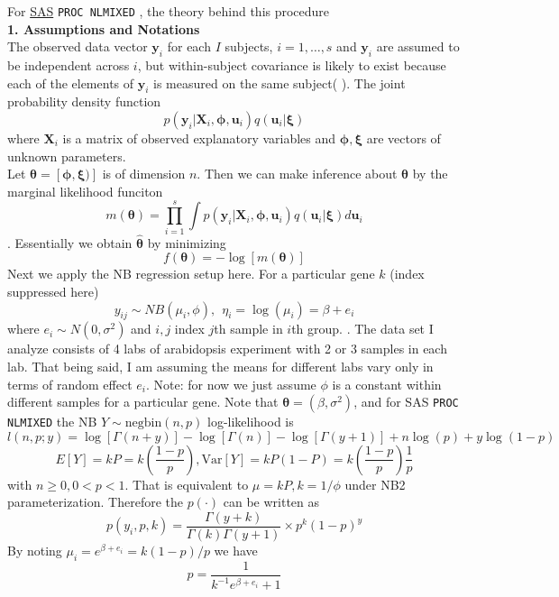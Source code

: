 \documentclass[paper=a4, fontsize=12.5pt]{scrartcl} %
\numberwithin{equation}{section} %
\numberwithin{figure}{section} %
\numberwithin{table}{section} %
\begin{document}
For  \href{http://support.sas.com/documentation/cdl/en/statug/63033/HTML/default
/viewer.htm#statug_nlmixed_sect022.htm}{SAS} \verb"PROC NLMIXED" , the theory behind this procedure \\
\textbf{1. Assumptions and Notations}\\
  The observed data vector $\bm y_i$ for each $I$ subjects, $i=1, \ldots, s$ and $\bm y_i$ are assumed to be independent across $i$, but within-subject covariance is likely to exist because each of the elements of $\bm y_i$ is measured on the same subject( {\color{blue}{that implies it can deal with repeated measurement}}). The joint probability density function 
  \[p(\bm y_i|\bm X_i, \bm \phi, \bm u_i)q(\bm u_i|\bm \xi)\]
  where $\bm X_i$ is a matrix of observed explanatory variables and $\bm \phi, \bm \xi$ are vectors of unknown parameters.\\
  Let $\bm \theta =[\bm \phi, \bm \xi)]$ is of dimension $n$. Then we can make inference about $\bm\theta$ by the marginal likelihood funciton
  \[m(\bm \theta)= \prod_{i=1}^s\int p(\bm y_i|\bm X_i, \bm \phi, \bm u_i)q(\bm u_i|\bm \xi)d\bm u_i\]. Essentially we obtain $\hat{\bm \theta}$ by minimizing 
  $$f(\bm \theta)= -\log [m(\bm \theta)]$$
 Next we apply the NB regression setup here. For a particular gene $k$ (index suppressed here)
  \[y_{ij} \sim NB(\mu_i, \phi), ~~ \eta_i = \log(\mu_i)= \beta + e_i\]
  where $e_i\sim N(0, \sigma^2)$ and $i, j$ index $j$th sample in $i$th group. {\color{blue}{not sure if normalization is needed yet, in which case we might begin with $\log(\mu_i)= \beta + \log (N_i R_i) + e_i$}}. The data set I analyze consists of 4 labs of arabidopsis experiment with 2 or 3 samples in each lab. That being said, I am assuming the means for different labs vary only in terms of random effect $e_i$.  {\color{blue} Note: for now we just assume $\phi$ is a constant within different samples for a particular gene.}
  Note that $\bm \theta= (\beta, \sigma^2)$, and for SAS \verb"PROC NLMIXED" the NB $Y\sim \text{negbin}(n, p)$ log-likelihood is 
  \[  l(n, p; y)= \log[\Gamma(n+y)]- \log[\Gamma(n)] - \log[\Gamma(y +1)] + n\log(p) + y\log(1-p)\]
  \[E[Y] = kP = k\left(\frac{1-p}{p}\right), \text{Var}[Y] = kP(1-P) = k \left(\frac{1-p}{p}\right)\frac{1}{p}\] 
  with $n \geq 0 , 0 <p < 1$. That is equivalent to $\mu = kP, k = 1/\phi$  under NB2 parameterization.  Therefore the $p(\cdot)$ can be written as 
  \[p(y_i, p, k)= \frac{\Gamma(y+ k)}{\Gamma(k)\Gamma(y + 1)}\times p^k(1-p)^y\]
  By noting $\mu_i= e^{\beta + e_i}= k(1-p)/p$ we have  
  \[ p =  \frac{1}{k^{-1}e^{\beta  + e_i} + 1}\]
\end{document}
